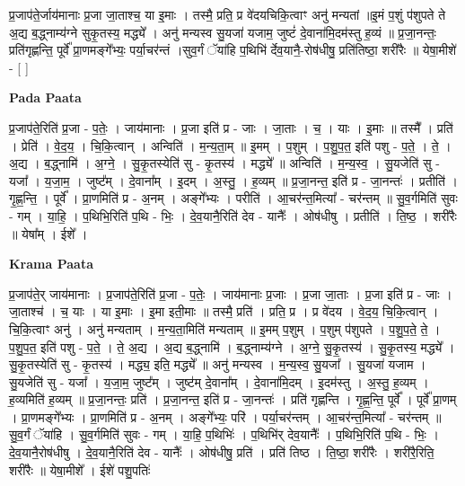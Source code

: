 \documentclass[17pt]{extarticle}
\begin{document}
प्र॒जाप॑ते॒र्जाय॑मानाः प्र॒जा जा॒ताश्च॒ या इ॒माः । तस्मै॒ प्रति॒ प्र वे॑दयचिकि॒त्वाꣳ अनु॑ मन्यतां ॥इ॒मं प॒शुं प॑शुपते ते अ॒द्य ब॒द्ध्नाम्य॑ग्ने सुकृ॒तस्य॒ मद्ध्ये᳚ । अनु॑ मन्यस्व सु॒यजा॑ यजाम॒ जुष्टं॑ दे॒वाना॑मि॒दम॑स्तु ह॒व्यं ॥ प्र॒जा॒नन्तः॒ प्रति॑गृह्णन्ति॒ पूर्वे᳚ प्रा॒णमङ्गे᳚भ्यः॒ पर्या॒चर॑न्तं ।सुव॒र्गं ॅया॑हि प॒थिभि॑ र्देव॒यानै॒-रोष॑धीषु॒ प्रति॑तिष्ठा॒ शरी॑रैः ॥ येषा॒मीशे॑ - [  ] \newline

\textbf{Pada Paata} \newline

प्र॒जाप॑ते॒रिति॑ प्र॒जा - प॒तेः॒ । जाय॑मानाः । प्र॒जा इति॑ प्र - जाः । जा॒ताः । च॒ । याः । इ॒माः ॥ तस्मै᳚ । प्रति॑ । प्रेति॑ । वे॒द॒य॒ । चि॒कि॒त्वान् । अन्विति॑ । म॒न्य॒ता॒म् ॥ इ॒मम् । प॒शुम् । प॒शु॒प॒त॒ इति॑ पशु - प॒ते॒ । ते॒ । अ॒द्य । ब॒द्ध्नामि॑ । अ॒ग्ने॒ । सु॒कृ॒तस्येति॑ सु - कृ॒तस्य॑ । मद्ध्ये᳚ ॥ अन्विति॑ । म॒न्य॒स्व॒ । सु॒यजेति॑ सु - यजा᳚ । य॒जा॒म॒ । जुष्ट᳚म् । दे॒वाना᳚म् । इ॒दम् । अ॒स्तु॒ । ह॒व्यम् ॥ प्र॒जा॒नन्त॒ इति॑ प्र - जा॒नन्तः॑ । प्रतीति॑ । गृ॒ह्ण॒न्ति॒ । पूर्वे᳚ । प्रा॒णमिति॑ प्र - अ॒नम् । अङ्गे᳚भ्यः । परीति॑ । आ॒चर॑न्त॒मित्या᳚ - चर॑न्तम् ॥ सु॒व॒र्गमिति॑ सुवः - गम् । या॒हि॒ । प॒थिभि॒रिति॑ प॒थि - भिः॒ । दे॒व॒यानै॒रिति॑ देव - यानैः᳚ । ओष॑धीषु । प्रतीति॑ । ति॒ष्ठ॒ । शरी॑रैः ॥ येषा᳚म् । ईशे᳚ ।  \newline


\textbf{Krama Paata} \newline

प्र॒जाप॑ते॒र् जाय॑मानाः । प्र॒जाप॑ते॒रिति॑ प्र॒जा - प॒तेः॒ । जाय॑मानाः प्र॒जाः । प्र॒जा जा॒ताः । प्र॒जा इति॑ प्र - जाः । जा॒ताश्च॑ । च॒ याः । या इ॒माः । इ॒मा इती॒माः ॥ तस्मै॒ प्रति॑ । प्रति॒ प्र । प्र वे॑दय । वे॒द॒य॒ चि॒कि॒त्वान् । चि॒कि॒त्वाꣳ अनु॑ । अनु॑ मन्यताम् । म॒न्य॒ता॒मिति॑ मन्यताम् ॥ इ॒मम् प॒शुम् । प॒शुम् प॑शुपते । प॒शु॒प॒ते॒ ते॒ । प॒शु॒प॒त॒ इति॑ पशु - प॒ते॒ । ते॒ अ॒द्य । अ॒द्य ब॒द्ध्नामि॑ । ब॒द्ध्नाम्य॑ग्ने । अ॒ग्ने॒ सु॒कृ॒तस्य॑ । सु॒कृ॒तस्य॒ मद्ध्ये᳚ । सु॒कृ॒तस्येति॑ सु - कृ॒तस्य॑ । मद्ध्य॒ इति॒ मद्ध्ये᳚ ॥ अनु॑ मन्यस्व । म॒न्य॒स्व॒ सु॒यजा᳚ । सु॒यजा॑ यजाम । सु॒यजेति॑ सु - यजा᳚ । य॒जा॒म॒ जुष्ट᳚म् । जुष्ट॑म् दे॒वाना᳚म् । दे॒वाना॑मि॒दम् । इ॒दम॑स्तु । अ॒स्तु॒ ह॒व्यम् । ह॒व्यमिति॑ ह॒व्यम् ॥ प्र॒जा॒नन्तः॒ प्रति॑ । प्र॒जा॒नन्त॒ इति॑ प्र - जा॒नन्तः॑ । प्रति॑ गृह्णन्ति । गृ॒ह्ण॒न्ति॒ पूर्वे᳚ । पूर्वे᳚ प्रा॒णम् । प्रा॒णमङ्गे᳚भ्यः । प्रा॒णमिति॑ प्र - अ॒नम् । अङ्गे᳚भ्यः॒ परि॑ । पर्या॒चर॑न्तम् । आ॒चर॑न्त॒मित्या᳚ - चर॑न्तम् ॥ सु॒व॒र्गं ॅया॑हि । सु॒व॒र्गमिति॑ सुवः - गम् । या॒हि॒ प॒थिभिः॑ । प॒थिभि॑र् देव॒यानैः᳚ । प॒थिभि॒रिति॑ प॒थि - भिः॒ । दे॒व॒यानै॒रोष॑धीषु । दे॒व॒यानै॒रिति॑ देव - यानैः᳚ । ओष॑धीषु॒ प्रति॑ । प्रति॑ तिष्ठ । ति॒ष्ठा॒ शरी॑रैः । शरी॑रै॒रिति॒ शरी॑रैः ॥ येषा॒मीशे᳚ । ईशे॑ पशु॒पतिः॑ \newline
\end{document}
